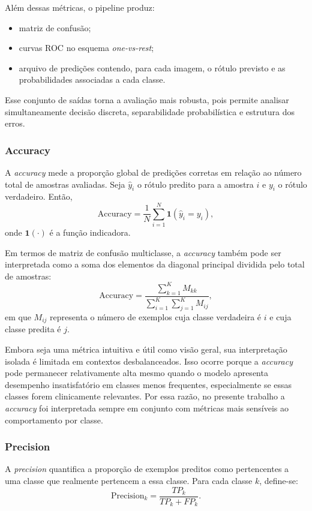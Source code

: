 \documentclass[tcc,capa]{texufpel}
\begin{document}
Além dessas métricas, o pipeline produz:
\begin{itemize}
	\item matriz de confusão;
	\item curvas ROC no esquema \textit{one-vs-rest};
	\item arquivo de predições contendo, para cada imagem, o rótulo previsto e as probabilidades associadas a cada classe.
\end{itemize}

Esse conjunto de saídas torna a avaliação mais robusta, pois permite analisar simultaneamente decisão discreta, separabilidade probabilística e estrutura dos erros.

\subsubsection{Accuracy}

A \textit{accuracy} mede a proporção global de predições corretas em relação ao número total de amostras avaliadas. Seja \(\hat{y}_i\) o rótulo predito para a amostra \(i\) e \(y_i\) o rótulo verdadeiro. Então,
\[
\text{Accuracy}
=
\frac{1}{N}\sum_{i=1}^{N}\mathbf{1}(\hat{y}_i = y_i),
\]
onde \(\mathbf{1}(\cdot)\) é a função indicadora.

Em termos de matriz de confusão multiclasse, a \textit{accuracy} também pode ser interpretada como a soma dos elementos da diagonal principal dividida pelo total de amostras:
\[
\text{Accuracy}
=
\frac{\sum_{k=1}^{K} M_{kk}}{\sum_{i=1}^{K}\sum_{j=1}^{K} M_{ij}},
\]
em que \(M_{ij}\) representa o número de exemplos cuja classe verdadeira é \(i\) e cuja classe predita é \(j\).

Embora seja uma métrica intuitiva e útil como visão geral, sua interpretação isolada é limitada em contextos desbalanceados. Isso ocorre porque a \textit{accuracy} pode permanecer relativamente alta mesmo quando o modelo apresenta desempenho insatisfatório em classes menos frequentes, especialmente se essas classes forem clinicamente relevantes. Por essa razão, no presente trabalho a \textit{accuracy} foi interpretada sempre em conjunto com métricas mais sensíveis ao comportamento por classe.

\subsubsection{Precision}

A \textit{precision} quantifica a proporção de exemplos preditos como pertencentes a uma classe que realmente pertencem a essa classe. Para cada classe \(k\), define-se:
\[
\text{Precision}_k
=
\frac{TP_k}{TP_k + FP_k}.
\]
\end{document}
